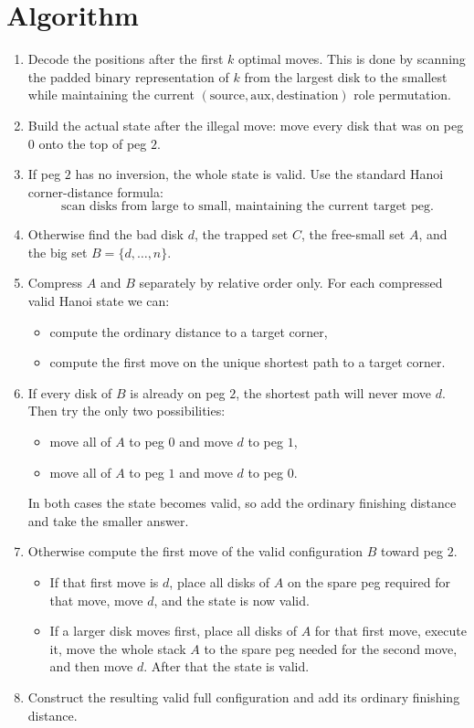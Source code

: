\documentclass[11pt]{article}
\begin{document}
\section*{Algorithm}

\begin{enumerate}[leftmargin=*]
    \item Decode the positions after the first $k$ optimal moves. This is done by scanning the padded binary representation of $k$ from the largest disk to the smallest while maintaining the current $(\text{source},\text{aux},\text{destination})$ role permutation.
    \item Build the actual state after the illegal move: move every disk that was on peg $0$ onto the top of peg $2$.
    \item If peg $2$ has no inversion, the whole state is valid. Use the standard Hanoi corner-distance formula:
    \[
        \text{scan disks from large to small, maintaining the current target peg.}
    \]
    \item Otherwise find the bad disk $d$, the trapped set $C$, the free-small set $A$, and the big set $B=\{d,\dots,n\}$.
    \item Compress $A$ and $B$ separately by relative order only. For each compressed valid Hanoi state we can:
    \begin{itemize}[leftmargin=*]
        \item compute the ordinary distance to a target corner,
        \item compute the first move on the unique shortest path to a target corner.
    \end{itemize}
    \item If every disk of $B$ is already on peg $2$, the shortest path will never move $d$. Then try the only two possibilities:
    \begin{itemize}[leftmargin=*]
        \item move all of $A$ to peg $0$ and move $d$ to peg $1$,
        \item move all of $A$ to peg $1$ and move $d$ to peg $0$.
    \end{itemize}
    In both cases the state becomes valid, so add the ordinary finishing distance and take the smaller answer.
    \item Otherwise compute the first move of the valid configuration $B$ toward peg $2$.
    \begin{itemize}[leftmargin=*]
        \item If that first move is $d$, place all disks of $A$ on the spare peg required for that move, move $d$, and the state is now valid.
        \item If a larger disk moves first, place all disks of $A$ for that first move, execute it, move the whole stack $A$ to the spare peg needed for the second move, and then move $d$. After that the state is valid.
    \end{itemize}
    \item Construct the resulting valid full configuration and add its ordinary finishing distance.
\end{enumerate}
\end{document}
